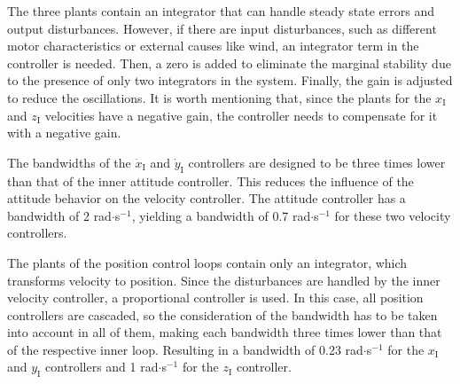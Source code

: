 The three plants contain an integrator that can handle steady state errors and output disturbances. However, if there are input disturbances, such as different motor characteristics or external causes like wind, an integrator term in the controller is needed. Then, a zero is added to eliminate the marginal stability due to the presence of only two integrators in the system. Finally, the gain is adjusted to reduce the oscillations. It is worth mentioning that, since the plants for the $x_{\mathrm{I}}$ and $z_{\mathrm{I}}$ velocities have a negative gain, the controller needs to compensate for it with a negative gain.

The bandwidths of the $\dot{x}_{\mathrm{I}}$ and $\dot{y}_{\mathrm{I}}$ controllers are designed to be three times lower than that of the inner attitude controller. This reduces the influence of the attitude behavior on the velocity controller. The attitude controller has a bandwidth of 2 rad$\cdot$s$^{-1}$, yielding a bandwidth of 0.7 rad$\cdot$s$^{-1}$ for these two velocity controllers.



The plants of the position control loops contain only an integrator, which transforms velocity to position. Since the disturbances are handled by the inner velocity controller, a proportional controller is used. In this case, all position controllers are cascaded, so the consideration of the bandwidth has to be taken into account in all of them, making each bandwidth three times lower than that of the respective inner loop. Resulting in a bandwidth of 0.23 rad$\cdot$s$^{-1}$ for the $x_{\mathrm{I}}$ and $y_{\mathrm{I}}$ controllers and 1 rad$\cdot$s$^{-1}$ for the $z_{\mathrm{I}}$ controller.

